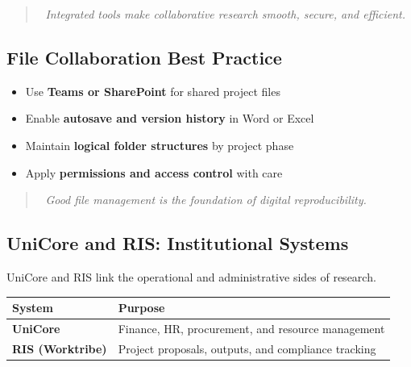 \documentclass[
  letterpaper,
  DIV=11,
  numbers=noendperiod]{scrartcl}
\providecommand{\tightlist}{%
  \setlength{\itemsep}{0pt}\setlength{\parskip}{0pt}}
\begin{document}
\begin{quote}
🔁 \emph{Integrated tools make collaborative research smooth, secure,
and efficient.}
\end{quote}

\subsection{File Collaboration Best
Practice}\label{file-collaboration-best-practice}

\begin{itemize}
\tightlist
\item
  Use \textbf{Teams or SharePoint} for shared project files\\
\item
  Enable \textbf{autosave and version history} in Word or Excel\\
\item
  Maintain \textbf{logical folder structures} by project phase\\
\item
  Apply \textbf{permissions and access control} with care
\end{itemize}

\begin{quote}
🧠 \emph{Good file management is the foundation of digital
reproducibility.}
\end{quote}

\subsection{UniCore and RIS: Institutional
Systems}\label{unicore-and-ris-institutional-systems}

UniCore and RIS link the operational and administrative sides of
research.

\begin{longtable}[]{@{}
  >{\raggedright\arraybackslash}p{}
  >{\raggedright\arraybackslash}p{}@{}}
\toprule\noalign{}
\begin{minipage}[b]{\linewidth}\raggedright
\textbf{System}
\end{minipage} & \begin{minipage}[b]{\linewidth}\raggedright
\textbf{Purpose}
\end{minipage} \\
\midrule\noalign{}
\endhead
\bottomrule\noalign{}
\endlastfoot
\textbf{UniCore} & Finance, HR, procurement, and resource management \\
\textbf{RIS (Worktribe)} & Project proposals, outputs, and compliance
tracking \\
\end{longtable}
\end{document}
